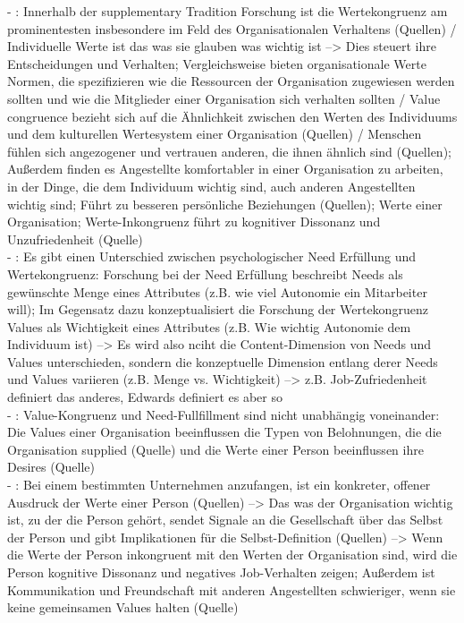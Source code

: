 - \cite[S. 2]{edwards:2004}: Innerhalb der supplementary Tradition Forschung ist die Wertekongruenz am prominentesten insbesondere im Feld des Organisationalen Verhaltens (Quellen) / Individuelle Werte ist das was sie glauben was wichtig ist --> Dies steuert ihre Entscheidungen und Verhalten; Vergleichsweise bieten organisationale Werte Normen, die spezifizieren wie die Ressourcen der Organisation zugewiesen werden sollten und wie die Mitglieder einer Organisation sich verhalten sollten / Value congruence bezieht sich auf die Ähnlichkeit zwischen den Werten des Individuums und dem kulturellen Wertesystem einer Organisation (Quellen) / Menschen fühlen sich angezogener und vertrauen anderen, die ihnen ähnlich sind (Quellen); Außerdem finden es Angestellte komfortabler in einer Organisation zu arbeiten, in der Dinge, die dem Individuum wichtig sind, auch anderen Angestellten wichtig sind; Führt zu besseren persönliche Beziehungen (Quellen); Werte einer Organisation; Werte-Inkongruenz führt zu kognitiver Dissonanz und Unzufriedenheit (Quelle) \\
- \cite[S. 2]{edwards:2004}: Es gibt einen Unterschied zwischen psychologischer Need Erfüllung und Wertekongruenz: Forschung bei der Need Erfüllung beschreibt Needs als gewünschte Menge eines Attributes (z.B. wie viel Autonomie ein Mitarbeiter will); Im Gegensatz dazu konzeptualisiert die Forschung der Wertekongruenz Values als Wichtigkeit eines Attributes (z.B. Wie wichtig Autonomie dem Individuum ist) --> Es wird also nciht die Content-Dimension von Needs und Values unterschieden, sondern die konzeptuelle Dimension entlang derer Needs und Values variieren (z.B. Menge vs. Wichtigkeit) --> z.B. Job-Zufriedenheit definiert das anderes, Edwards definiert es aber so \\
- \cite[S. 3]{edwards:2004}: Value-Kongruenz und Need-Fullfillment sind nicht unabhängig voneinander: Die Values einer Organisation beeinflussen die Typen von Belohnungen, die die Organisation supplied (Quelle) und die Werte einer Person beeinflussen ihre Desires (Quelle) \\
- \cite[S. 3]{edwards:2004}: Bei einem bestimmten Unternehmen anzufangen, ist ein konkreter, offener Ausdruck der Werte einer Person (Quellen) --> Das was der Organisation wichtig ist, zu der die Person gehört, sendet Signale an die Gesellschaft über das Selbst der Person und gibt Implikationen für die Selbst-Definition (Quellen) --> Wenn die Werte der Person inkongruent mit den Werten der Organisation sind, wird die Person kognitive Dissonanz und negatives Job-Verhalten zeigen; Außerdem ist Kommunikation und Freundschaft mit anderen Angestellten schwieriger, wenn sie keine gemeinsamen Values halten (Quelle)\\
